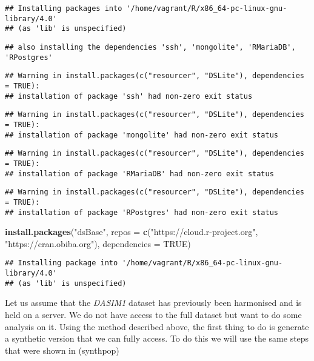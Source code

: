 \documentclass[
]{book}
\newenvironment{Shaded}{\begin{snugshade}}{\end{snugshade}}
\newcommand{\DataTypeTok}[1]{\textcolor[rgb]{0.13,0.29,0.53}{#1}}
\newcommand{\KeywordTok}[1]{\textcolor[rgb]{0.13,0.29,0.53}{\textbf{#1}}}
\newcommand{\NormalTok}[1]{#1}
\newcommand{\OtherTok}[1]{\textcolor[rgb]{0.56,0.35,0.01}{#1}}
\newcommand{\StringTok}[1]{\textcolor[rgb]{0.31,0.60,0.02}{#1}}
\begin{document}
\begin{verbatim}
## Installing packages into '/home/vagrant/R/x86_64-pc-linux-gnu-library/4.0'
## (as 'lib' is unspecified)
\end{verbatim}

\begin{verbatim}
## also installing the dependencies 'ssh', 'mongolite', 'RMariaDB', 'RPostgres'
\end{verbatim}

\begin{verbatim}
## Warning in install.packages(c("resourcer", "DSLite"), dependencies = TRUE):
## installation of package 'ssh' had non-zero exit status
\end{verbatim}

\begin{verbatim}
## Warning in install.packages(c("resourcer", "DSLite"), dependencies = TRUE):
## installation of package 'mongolite' had non-zero exit status
\end{verbatim}

\begin{verbatim}
## Warning in install.packages(c("resourcer", "DSLite"), dependencies = TRUE):
## installation of package 'RMariaDB' had non-zero exit status
\end{verbatim}

\begin{verbatim}
## Warning in install.packages(c("resourcer", "DSLite"), dependencies = TRUE):
## installation of package 'RPostgres' had non-zero exit status
\end{verbatim}

\begin{Shaded}
\begin{Highlighting}[]
\KeywordTok{install.packages}\NormalTok{(}\StringTok{"dsBase"}\NormalTok{, }\DataTypeTok{repos =} \KeywordTok{c}\NormalTok{(}\StringTok{"https://cloud.r-project.org"}\NormalTok{, }\StringTok{"https://cran.obiba.org"}\NormalTok{), }\DataTypeTok{dependencies =} \OtherTok{TRUE}\NormalTok{)}
\end{Highlighting}
\end{Shaded}

\begin{verbatim}
## Installing package into '/home/vagrant/R/x86_64-pc-linux-gnu-library/4.0'
## (as 'lib' is unspecified)
\end{verbatim}

Let us assume that the \emph{DASIM1} dataset has previously been harmonised and is held on a server. We do not have access to the full dataset but want to do some analysis on it. Using the method described above, the first thing to do is generate a synthetic version that we can fully access. To do this we will use the same steps that were shown in \citet{ref}(synthpop)
\end{document}
